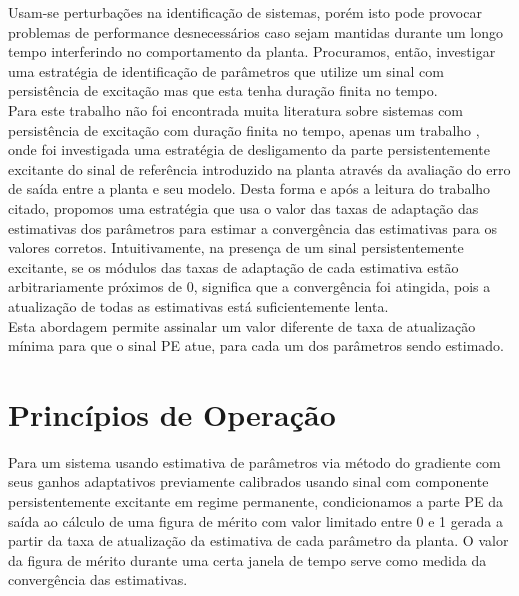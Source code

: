 \documentclass[
	12pt,				%
	openright,			%
	twoside,			%
	a4paper,			%
	english,			%
	french,				%
	spanish,			%
	brazil				%
	]{abntex2}
\begin{document}
Usam-se perturbações na identificação de sistemas, porém isto pode provocar problemas de performance desnecessários caso sejam mantidas durante um longo tempo interferindo no comportamento da planta. Procuramos, então, investigar uma estratégia de identificação de parâmetros que utilize um sinal com persistência de excitação mas que esta tenha duração finita no tempo.\\  

Para este trabalho não foi encontrada muita literatura sobre sistemas com persistência de excitação com duração finita no tempo, apenas um trabalho \cite{naval}, onde foi investigada uma estratégia de desligamento da parte persistentemente excitante do sinal de referência introduzido na planta através da avaliação do erro de saída entre a planta e seu modelo. Desta forma e após a leitura do trabalho citado, propomos uma estratégia que usa o valor das taxas de adaptação das estimativas dos parâmetros para estimar a convergência das estimativas para os valores corretos. Intuitivamente, na presença de um sinal persistentemente excitante, se os módulos das taxas de adaptação de cada estimativa estão arbitrariamente próximos de 0, significa que a convergência foi atingida, pois a atualização de todas as estimativas está suficientemente lenta.\\ 

Esta abordagem permite assinalar um valor diferente de taxa de atualização mínima para que o sinal PE atue, para cada um dos parâmetros sendo estimado.\\ 

\section{Princípios de Operação}

Para um sistema usando estimativa de parâmetros via método do gradiente com seus ganhos adaptativos previamente calibrados usando sinal com componente persistentemente excitante em regime permanente, condicionamos a parte PE da saída ao cálculo de uma figura de mérito com valor limitado entre 0 e 1 gerada a partir da taxa de atualização da estimativa de cada parâmetro da planta. O valor da figura de mérito durante uma certa janela de tempo serve como medida da convergência das estimativas.\\ 
\end{document}
